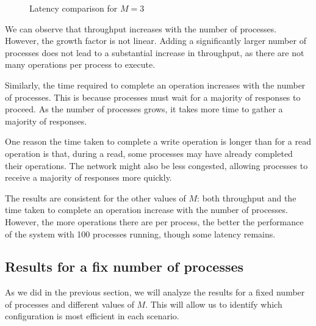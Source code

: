 \documentclass{article}
\begin{document}
\begin{figure}[ht!]
    \centering
    \caption{Latency comparison for \( M = 3 \)}
\end{figure}


We can observe that throughput increases with the number of processes. However,
the growth factor is not linear. Adding a significantly larger number of processes
does not lead to a substantial increase in throughput, as there are not many
operations per process to execute.

Similarly, the time required to complete an operation increases with the number
of processes. This is because processes must wait for a majority of responses
to proceed. As the number of processes grows, it takes more time to gather a
majority of responses.

One reason the time taken to complete a write operation is longer than for a
read operation is that, during a read, some processes may have already completed
their operations. The network might also be less congested, allowing processes
to receive a majority of responses more quickly.

\vspace{10pt}
The results are consistent for the other values of
$M$: both throughput and the time taken to complete an operation
increase with the number of processes. However, the more operations
there are per process, the better the performance of the system with
 100 processes running, though some latency remains.

\newpage

\subsection{Results for a fix number of processes}
As we did in the previous section, we will analyze the results for
a fixed number of processes and different values of $M$. This will allow us
to identify which configuration is most efficient in each scenario.
\end{document}
